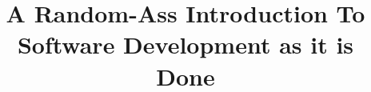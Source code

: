 \documentclass{beamer}
\title{A Random-Ass Introduction To Software Development as it is Done}
\author{}
\date{}
\begin{document}
\begin{frame}
\titlepage
\end{frame}

%

\end{document}
